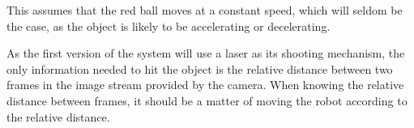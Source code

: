 This assumes that the red ball moves at a constant speed, which will seldom be the case, as the object is likely to be accelerating or decelerating.


As the first version of the system will use a laser as its shooting mechanism, the only information needed to hit the object is the relative distance between two frames in the image stream provided by the camera. 
When knowing the relative distance between frames, it should be a matter of moving the robot according to the relative distance.
